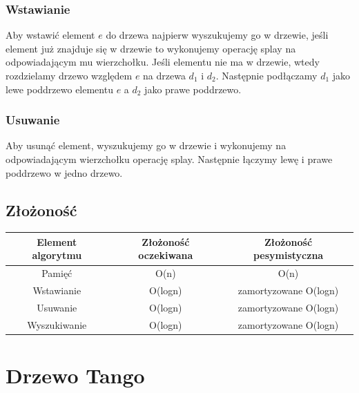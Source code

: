 \documentclass[declaration,shortabstract]{iithesis}
\begin{document}
\subsection{Wstawianie}
Aby wstawić element \(e\) do drzewa najpierw wyszukujemy go w drzewie, jeśli element już znajduje się w drzewie to wykonujemy operację splay na odpowiadającym mu wierzchołku. Jeśli elementu nie ma w drzewie, wtedy rozdzielamy drzewo względem \(e\) na drzewa \(d_1\) i \( d_2\). Następnie podłączamy \(d_1\) jako lewe poddrzewo elementu  \(e\) a \(d_2\) jako prawe poddrzewo. 

\subsection{Usuwanie}
Aby usunąć element, wyszukujemy go w drzewie i wykonujemy na odpowiadającym wierzchołku operację splay. Następnie łączymy lewę i prawe poddrzewo w jedno drzewo. 

\section{Złożoność}
\begin{tabular}{|c|c|c|}
\hline
Element algorytmu & Złożoność oczekiwana &  Złożoność pesymistyczna  \\
\hline
Pamięć & O(n) & O(n)  \\
\hline
Wstawianie & O(logn) & zamortyzowane O(logn)  \\
\hline
Usuwanie & O(logn) & zamortyzowane O(logn)  \\
\hline
Wyszukiwanie & O(logn) & zamortyzowane O(logn) \\
\hline

\end{tabular}

\chapter{ Drzewo Tango}



\end{document}
